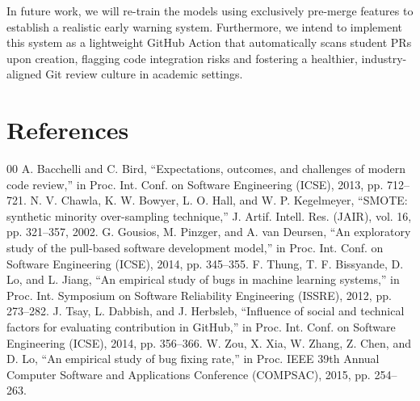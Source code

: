 \documentclass[conference]{IEEEtran}
\begin{document}
In future work, we will re-train the models using exclusively pre-merge features to establish a realistic early warning system. Furthermore, we intend to implement this system as a lightweight GitHub Action that automatically scans student PRs upon creation, flagging code integration risks and fostering a healthier, industry-aligned Git review culture in academic settings.

\section*{References}
\begin{thebibliography}{00}
 A. Bacchelli and C. Bird, ``Expectations, outcomes, and challenges of modern code review,'' in Proc. Int. Conf. on Software Engineering (ICSE), 2013, pp. 712--721.
 N. V. Chawla, K. W. Bowyer, L. O. Hall, and W. P. Kegelmeyer, ``SMOTE: synthetic minority over-sampling technique,'' J. Artif. Intell. Res. (JAIR), vol. 16, pp. 321--357, 2002.
 G. Gousios, M. Pinzger, and A. van Deursen, ``An exploratory study of the pull-based software development model,'' in Proc. Int. Conf. on Software Engineering (ICSE), 2014, pp. 345--355.
 F. Thung, T. F. Bissyande, D. Lo, and L. Jiang, ``An empirical study of bugs in machine learning systems,'' in Proc. Int. Symposium on Software Reliability Engineering (ISSRE), 2012, pp. 273--282.
 J. Tsay, L. Dabbish, and J. Herbsleb, ``Influence of social and technical factors for evaluating contribution in GitHub,'' in Proc. Int. Conf. on Software Engineering (ICSE), 2014, pp. 356--366.
 W. Zou, X. Xia, W. Zhang, Z. Chen, and D. Lo, ``An empirical study of bug fixing rate,'' in Proc. IEEE 39th Annual Computer Software and Applications Conference (COMPSAC), 2015, pp. 254--263.
\end{thebibliography}
\end{document}
